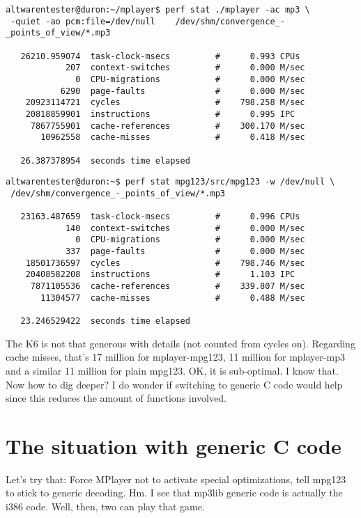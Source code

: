 \documentclass[a4paper,12pt]{scrartcl}
\begin{document}
\begin{verbatim}
altwarentester@duron:~/mplayer$ perf stat ./mplayer -ac mp3 \
 -quiet -ao pcm:file=/dev/null    /dev/shm/convergence_-_points_of_view/*.mp3

   26210.959074  task-clock-msecs         #      0.993 CPUs 
            207  context-switches         #      0.000 M/sec
              0  CPU-migrations           #      0.000 M/sec
           6290  page-faults              #      0.000 M/sec
    20923114721  cycles                   #    798.258 M/sec
    20818859901  instructions             #      0.995 IPC  
     7867755901  cache-references         #    300.170 M/sec
       10962558  cache-misses             #      0.418 M/sec

   26.387378954  seconds time elapsed
\end{verbatim}

\begin{verbatim}
altwarentester@duron:~$ perf stat mpg123/src/mpg123 -w /dev/null \
 /dev/shm/convergence_-_points_of_view/*.mp3

   23163.487659  task-clock-msecs         #      0.996 CPUs 
            140  context-switches         #      0.000 M/sec
              0  CPU-migrations           #      0.000 M/sec
            337  page-faults              #      0.000 M/sec
    18501736597  cycles                   #    798.746 M/sec
    20408582208  instructions             #      1.103 IPC  
     7871105536  cache-references         #    339.807 M/sec
       11304577  cache-misses             #      0.488 M/sec

   23.246529422  seconds time elapsed
\end{verbatim}

The K6 is not that generous with details (not counted from cycles on).
Regarding cache misses, that's 17 million for mplayer-mpg123, 11 million for mplayer-mp3 and a similar 11 million for plain mpg123. OK, it is sub-optimal. I know that. Now how to dig deeper? I do wonder if switching to generic C code would help since this reduces the amount of functions involved.

\section{The situation with generic C code}

Let's try that: Force MPlayer not to activate special optimizations, tell mpg123 to stick to generic decoding. Hm. I see that mp3lib generic code is actually the i386 code. Well, then, two can play that game.
\end{document}
